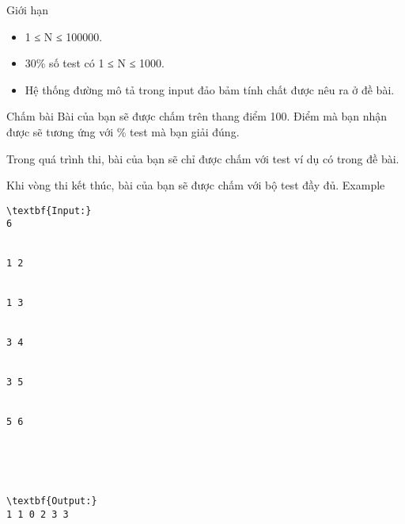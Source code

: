 Giới hạn
\begin{itemize}
	\item     1 ≤ N ≤ 100000.   
	\item     30\% số test có 1 ≤ N ≤ 1000.   
	\item     Hệ thống đường mô tả trong input đảo bảm tính chất được nêu ra ở đề bài.   
\end{itemize}
Chấm bài
Bài của bạn sẽ được chấm trên thang điểm 100. Điểm mà bạn nhận được sẽ tương ứng với \% test mà bạn giải đúng.  

   Trong quá trình thi, bài của bạn sẽ chỉ được chấm với test ví dụ có trong đề bài.  

   Khi vòng thi kết thúc, bài của bạn sẽ được chấm với bộ test đầy đủ.
Example
\begin{verbatim}
\textbf{Input:}
6


1 2


1 3


3 4


3 5


5 6





\textbf{Output:}
1 1 0 2 3 3
\end{verbatim}